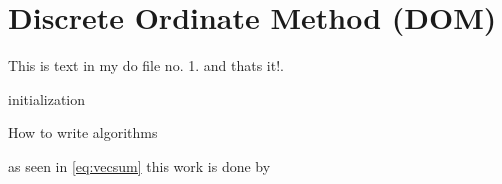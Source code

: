 %

\section{Discrete Ordinate Method (DOM)}
\label{ch:DOM}

This is text in my do file no. 1.
 and thats it!.

\begin{center}
\begin{algorithm}[H]
 \SetAlgoLined
 initialization\;
 \caption{How to write algorithms}
\end{algorithm}
\end{center}

as seen in \ref{eq:vecsum} this work is done by \cite{Hsu201239,Titarev20071446}

%
%

%
